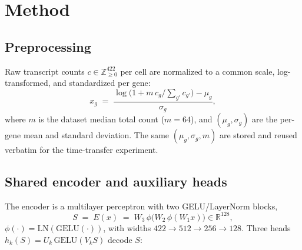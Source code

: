 \documentclass[10pt,twocolumn]{article}
\begin{document}
\begin{table}[t]\centering\small
\caption{Positioning against representative virtual-cell and spatial-generative
models. ``Axes'' = which of \{expression E, morphology M, space P, time T\} the
single model represents. Scale figures are as reported by each work.}
\label{tab:vc}
\setlength{\tabcolsep}{4pt}
\end{table}

\section{Method}
\subsection{Preprocessing}
Raw transcript counts $c\in\mathbb{Z}_{\ge0}^{422}$ per cell are normalized to a
common scale, log-transformed, and standardized per gene:
\begin{equation}
x_g \;=\; \frac{\log\!\big(1 + m\,c_g / \textstyle\sum_{g'} c_{g'}\big) - \mu_g}{\sigma_g},
\end{equation}
where $m$ is the dataset median total count ($m{=}64$), and $(\mu_g,\sigma_g)$
are the per-gene mean and standard deviation. The same $(\mu_g,\sigma_g,m)$ are
stored and reused verbatim for the time-transfer experiment.

\subsection{Shared encoder and auxiliary heads}
The encoder is a multilayer perceptron with two GELU/LayerNorm blocks,
\begin{equation}
S \;=\; E(x) \;=\; W_3\,\phi\big(W_2\,\phi(W_1 x)\big)\in\mathbb{R}^{128},
\end{equation}
$\phi(\cdot)=\mathrm{LN}(\mathrm{GELU}(\cdot))$, with widths $422\!\to\!512\!\to\!256\!\to\!128$.
Three heads $h_k(S)=U_k\,\mathrm{GELU}(V_k S)$ decode $S$:
\end{document}
